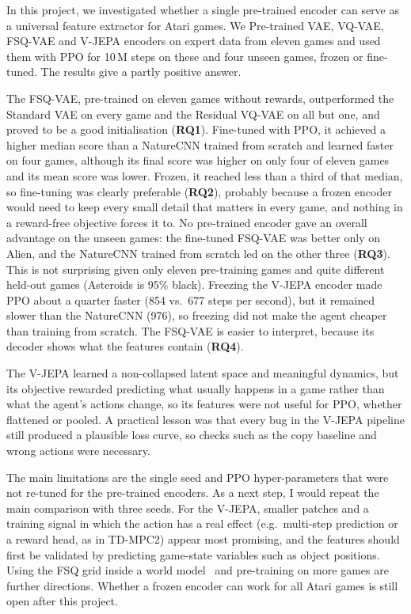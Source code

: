 \documentclass[runningheads]{llncs}
\begin{document}
In this project, we investigated whether a single pre-trained encoder can serve as a universal
feature extractor for Atari games. We Pre-trained VAE, VQ-VAE, FSQ-VAE and V-JEPA encoders on
expert data from eleven games and used them with PPO for 10\,M steps on these and four unseen
games, frozen or fine-tuned. The results give a partly positive answer.

The FSQ-VAE, pre-trained on eleven games without rewards, outperformed the Standard VAE on every
game and the Residual VQ-VAE on all but one, and proved to be a good initialisation
(\textbf{RQ1}). Fine-tuned with PPO, it achieved a higher median score than a NatureCNN trained
from scratch and learned faster on four games, although its final score was higher on only
four of eleven games and its mean score was lower. Frozen, it reached less than a third of that
median, so fine-tuning was clearly preferable (\textbf{RQ2}), probably because a frozen encoder
would need to keep every small detail that matters in every game, and nothing in a reward-free
objective forces it to. No pre-trained encoder gave an overall advantage on the unseen games: the
fine-tuned FSQ-VAE was better only on Alien, and the NatureCNN trained from scratch led on the
other three (\textbf{RQ3}). This is not surprising given only eleven pre-training games and
quite different held-out games (Asteroids is 95\% black). Freezing the V-JEPA encoder made PPO about a quarter
faster (854 vs.\ 677 steps per second), but it remained slower than the NatureCNN (976), so
freezing did not make the agent cheaper than training from scratch. The FSQ-VAE is easier to
interpret, because its decoder shows what the features contain (\textbf{RQ4}).

The V-JEPA learned a non-collapsed latent space and meaningful dynamics, but its objective
rewarded predicting what usually happens in a game rather than what the agent's actions change,
so its features were not useful for PPO, whether flattened or pooled. A practical lesson was that every bug in the V-JEPA pipeline still produced a plausible loss
curve, so checks such as the copy baseline and wrong actions were necessary.

The main limitations are the single seed and PPO hyper-parameters that were not re-tuned for
the pre-trained encoders. As a next step, I would repeat the main comparison with three seeds.
For the V-JEPA, smaller patches and a training signal in which the
action has a real effect (e.g.\ multi-step prediction or a reward head, as in TD-MPC2) appear
most promising, and the features should first be validated by predicting game-state variables
such as object positions. Using the FSQ grid inside a world
model~\cite{hafner2021dreamerv2,micheli2023iris} and pre-training on more games are further
directions. Whether a frozen encoder can work for all Atari games is still open after this
project.
\end{document}
